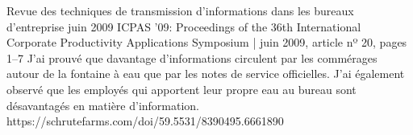 \publication
{Revue des techniques de transmission d’informations dans les bureaux d’entreprise}
{juin 2009}
{ICPAS '09: Proceedings of the 36th International Corporate Productivity Applications Symposium | juin 2009, article nº 20, pages 1–7}
{J’ai prouvé que davantage d’informations circulent par les commérages autour de la fontaine à eau que par les notes de service officielles. J’ai également observé que les employés qui apportent leur propre eau au bureau sont désavantagés en matière d’information.}
{https://schrutefarms.com/doi/59.5531/8390495.6661890}
